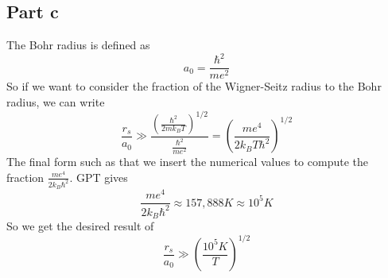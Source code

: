 \documentclass[12pt]{article}
\begin{document}
\subsection{Part c}
The Bohr radius is defined as
\begin{equation}
    a_0 = \frac{\hbar^2}{m e^2}
\end{equation}
So if we want to consider the fraction of the Wigner-Seitz radius to the Bohr radius, we can write
\begin{equation}
    \frac{r_s}{a_0} \gg \frac{\left(\frac{\hbar^2}{2mk_BT}\right)^{1/2}}{\frac{\hbar^2}{m e^2}} = \left(\frac{me^4}{2k_BT\hbar^2}\right)^{1/2}
\end{equation}
The final form such as that we insert the numerical values to compute the fraction $\frac{me^4}{2k_B\hbar^2}$. GPT gives
\begin{equation}
    \frac{me^4}{2k_B\hbar^2} \approx 157,888K \approx 10^5K
\end{equation}
So we get the desired result of
\begin{equation}
    \frac{r_s}{a_0} \gg \left(\frac{10^5 K}{T} \right)^{1/2}
\end{equation}
\end{document}
